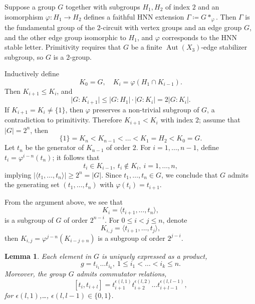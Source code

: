 \documentclass[12pt,leqno]{amsart}
\makeatletter
\renewenvironment{proof}[1][\proofname]{%
	\par
	\pushQED{\qed}%
	\normalfont
	\topsep6\p@\@plus6\p@\relax
	\trivlist
	\item[\hskip\labelsep\itshape #1\@addpunct{.}]%
	\ignorespaces
}{%
	\par\nobreak\vspace{2pt}%
	\popQED%
	\medskip%
	\endtrivlist
	\@endpefalse
}
\newcommand{\2}{L^2_{\rm per}(0, T)}
\newtheorem{lem}{Lemma}[section]
\newcommand{\aut}{{\operatorname{Aut}}}
\numberwithin{equation}{section}
\numberwithin{figure}{section}
\makeatother
\begin{document}
\begin{proof}
    Suppose a group $G$ together with subgroups $H_1,H_2$ of index $2$ and an isomorphism $\varphi: H_1\to H_2$ defines a faithful HNN extension $\Gamma\coloneqq G*_\varphi$. Then $\Gamma$ is the fundamental group of the $2$-circuit with vertex groups and an edge group $G$, and the other edge group isomorphic to $H_1$, and $\varphi$ corresponds to the HNN stable letter. Primitivity requires that $G$ be a finite $\aut(X_3)$-edge stabilizer subgroup, so $G$ is a $2$-group.

    Inductively define
    \[
    K_0 = G,\quad K_i = \varphi(H_1\cap K_{i-1}).
    \]
    Then $K_{i+1}\leq K_i$, and
    \[
    \lvert G:K_{i+1}\rvert\leq \lvert G:H_1\rvert\cdot \lvert G:K_i\rvert = 2\lvert G:K_i\rvert.
    \]
    If $K_{i+1} = K_i\neq \{1\}$, then $\varphi$ preserves a non-trivial subgroup of $G$, a contradiction to primitivity. Therefore $K_{i+1}<K_i$ with index $2$; assume that $\lvert G\rvert = 2^n$, then
    \[
    \{1\} = K_n<K_{n-1}<\dots<K_1=H_2<K_0=G.
    \]
    Let $t_n$ be the generator of $K_{n-1}$ of order $2$. For $i=1,\dots, n-1$, define $t_i = \varphi^{i-n}(t_{n})$; it follows that
    \[
    t_i\in K_{i-1},\ t_i\notin K_{i},\ i=1,\dots,n,
    \]
    implying $\lvert\langle t_1,\dots, t_n\rangle\rvert\geq 2^n = \lvert G\rvert$. Since $t_1,\dots, t_n\in G$, we conclude that $G$ admits the generating set $(t_1,\dots, t_n)$ with $\varphi(t_i) = t_{i+1}$.
\end{proof}
From the argument above, we see that
\[
K_i = \langle t_{i+1},\dots,t_{n}\rangle,
\]
is a subgroup of $G$ of order $2^{n-i}$. For $0\leq i< j\leq n$, denote
\[
K_{i,j} = \langle t_{i+1},\dots, t_j\rangle,
\]
then $K_{i,j} = \varphi^{j-n}(K_{i-j+n})$ is a subgroup of order $2^{j-i}$.
\begin{lem}\label{lem:comm}
    Each element in $G$ is uniquely expressed as a product,
    \[
    g = t_{i_1}\dots t_{i_k},\ 1\leq i_1<\dots < i_k\leq n.
    \]
    Moreover, the group $G$ admits commutator relations,
    \[
    [t_i,t_{i+l}] = t_{i+1}^{\epsilon(l,1)}t_{i+2}^{\epsilon(l,2)}\dots t_{i+l-1}^{\epsilon(l,l-1)},
    \]
    for $\epsilon(l,1)$,\dots, $\epsilon(l,l-1)\in \{0,1\}$.
\end{lem}
\end{document}
